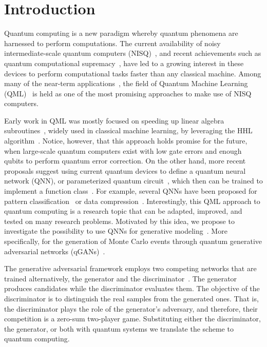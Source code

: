 \documentclass[twocolumn,preprintnumbers,superscriptaddress]{revtex4-2}
\begin{document}
\section{Introduction}

Quantum computing is a new paradigm whereby quantum phenomena are harnessed to
perform computations. The current availability of noisy intermediate-scale
quantum computers (NISQ)~\cite{nisq}, and recent achievements such as quantum
computational supremacy~\cite{supremacy, zhong2020quantum}, have led to a
growing interest in these devices to perform computational tasks faster than any
classical machine. Among many of the near-term
applications~\cite{cerezo2021variational, bharti2021noisy}, the field of Quantum
Machine Learning (QML)~\cite{biamonte2017quantum, schuld2018supervised} is held
as one of the most promising approaches to make use of NISQ computers.

Early work in QML was mostly focused on speeding up linear algebra
subroutines~\cite{wiebe2012quantum, lloyd:2013ml, Rebentrost:2014svm,
  kerenidis2020quantum}, widely used in classical machine learning, by leveraging
the HHL algorithm~\cite{harrow2009quantum}. Notice, however, that this approach holds
promise for the future, when large-scale quantum computers exist with low gate
errors and enough qubits to perform quantum error correction. On the other hand, more
recent proposals suggest using current quantum devices to define a quantum neural network (QNN), or parameterized
quantum circuit~\cite{benedetti2019parameterized, sim2019expressibility,
  bravo2020scaling}, which then can be trained to
implement a function class~\cite{schuld2021effect, goto2021universal,
  perez2021one}. For example, several QNNs have been proposed for pattern
classification~\cite{havlivcek2019supervised, Schuld:2020circuit,
  perezsalinas:2020reuploading, dutta2021realization} or data compression~\cite{romero2017quantum, pepper2019experimental,
  bravo2021quantum, cao2021noise}. Interestingly, this QML approach to quantum
computing is a research topic that can be adapted, improved, and tested on many
research problems. Motivated by this idea, we propose to investigate the
possibility to use QNNs for generative modeling~\cite{benedetti2019generative,
  hamilton2019generative, coyle2020born}. More specifically, for the generation of
Monte Carlo events through quantum generative adversarial networks
(qGANs)~\cite{dallaire2018quantum, lloyd2018quantum}.

The generative adversarial framework employs two competing networks that are
trained alternatively, the generator and the
discriminator~\cite{goodfellow2014generative}. The generator produces candidates
while the discriminator evaluates them. The objective of the discriminator is to
distinguish the real samples from the generated ones. That is, the discriminator
plays the role of the generator's adversary, and therefore, their competition is
a zero-sum two-player game. Substituting either the discriminator, the
generator, or both with quantum systems we translate the scheme to quantum
computing.
\end{document}

